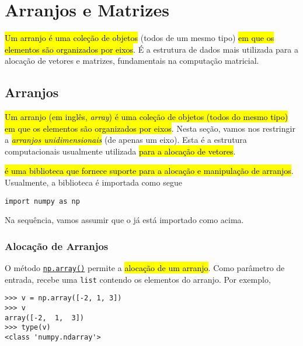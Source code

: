 
\chapter{Arranjos e Matrizes}\label{cap_arr}

\hl{Um arranjo é uma coleção de objetos} (todos de um mesmo tipo) \hl{em que os elementos são organizados por eixos}. É a estrutura de dados mais utilizada para a alocação de vetores e matrizes, fundamentais na computação matricial.

\section{Arranjos}\label{cap_arr_sec_arr}

\hl{Um arranjo (em inglês, \textit{array}) é uma coleção de objetos (todos do mesmo tipo) em que os elementos são organizados por eixos}. Nesta seção, vamos nos restringir a \hl{\emph{arranjos unidimensionais}} (de apenas um eixo). Esta é a estrutura computacionais usualmente utilizada \hl{para a alocação de vetores}.

\hl{{\numpy} é uma biblioteca {\python} que fornece suporte para a alocação e manipulação de arranjos}. Usualmente, a biblioteca é importada como segue

\begin{lstlisting}
import numpy as np
\end{lstlisting}

Na sequência, vamos assumir que o {\numpy} já está importado como acima.

\subsection{Alocação de Arranjos}

O método \href{https://numpy.org/doc/stable/reference/generated/numpy.array.html}{\texttt{np.array()}} permite a \hl{alocação de um arranjo}. Como parâmetro de entrada, recebe uma \lstinline+list+ contendo os elementos do arranjo. Por exemplo,

\begin{lstlisting}
>>> v = np.array([-2, 1, 3])
>>> v
array([-2,  1,  3])
>>> type(v)
<class 'numpy.ndarray'>
\end{lstlisting}

